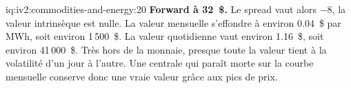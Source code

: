 \begin{solution}{iq:iv2:commodities-and-energy:20}
\textbf{Forward à 32~\$.} Le spread vaut alors $-8$, la valeur intrinsèque est nulle. La valeur mensuelle s'effondre à environ 0.04~\$ par MWh, soit environ 1\,500~\$. La valeur quotidienne vaut environ 1.16~\$, soit environ 41\,000~\$. Très hors de la monnaie, presque toute la valeur tient à la volatilité d'un jour à l'autre. Une centrale qui paraît morte sur la courbe mensuelle conserve donc une vraie valeur grâce aux pics de prix.

\end{solution}
